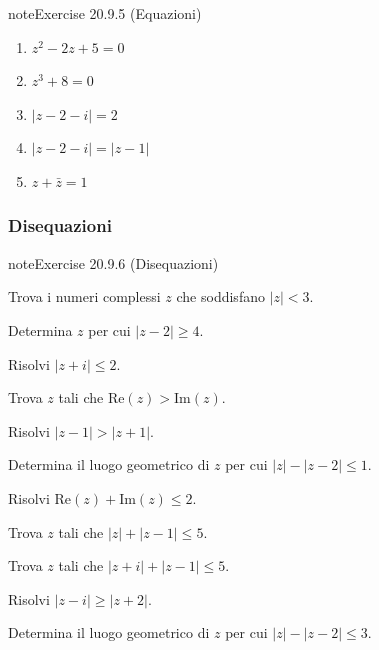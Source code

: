 \documentclass[letterpaper,10pt,italian]{jupyterBook}
\begin{document}
\begin{sphinxadmonition}{note}{Exercise 20.9.5 (Equazioni)}
\begin{enumerate}
\item {} 
\sphinxAtStartPar
\(z^2 - 2z + 5 = 0\)

\item {} 
\sphinxAtStartPar
\(z^3 + 8 = 0\)

\item {} 
\sphinxAtStartPar
\(|z-2-i| = 2\)

\item {} 
\sphinxAtStartPar
\(|z-2-i| = |z-1|\)

\item {} 
\sphinxAtStartPar
\(z + \bar{z} = 1\)

\end{enumerate}


\end{sphinxadmonition}


\subsubsection{Disequazioni}
\label{\detokenize{ch/algebra/complex-algebra-problems:disequazioni}}\label{\detokenize{ch/algebra/complex-algebra-problems:math-hs-algebra-complex-problems-equations-ineq}} \label{exercise:ch/algebra/complex-algebra-problems-exercise-5}

\begin{sphinxadmonition}{note}{Exercise 20.9.6 (Disequazioni)}



\sphinxAtStartPar
{} Trova i numeri complessi \(z\) che soddisfano \(|z| < 3\).

\sphinxAtStartPar
{} Determina \(z\) per cui \(|z - 2| \geq 4\).

\sphinxAtStartPar
{} Risolvi \(|z + i| \leq 2\).

\sphinxAtStartPar
{} Trova \(z\) tali che \(\text{Re}(z) > \text{Im}(z)\).

\sphinxAtStartPar
{} Risolvi \(|z - 1| > |z + 1|\).

\sphinxAtStartPar
{} Determina il luogo geometrico di \(z\) per cui \(|z| - |z-2| \leq 1\).

\sphinxAtStartPar
{} Risolvi \(\text{Re}(z) + \text{Im}(z) \leq 2\).

\sphinxAtStartPar
{} Trova \(z\) tali che \(|z| + |z - 1| \leq 5\).

\sphinxAtStartPar
{} Trova \(z\) tali che \(|z+i| + |z - 1| \leq 5\).

\sphinxAtStartPar
{} Risolvi \(|z - i| \geq |z + 2|\).

\sphinxAtStartPar
{} Determina il luogo geometrico di \(z\) per cui \(|z| - |z-2| \leq 3\).
\end{sphinxadmonition}
\end{document}
